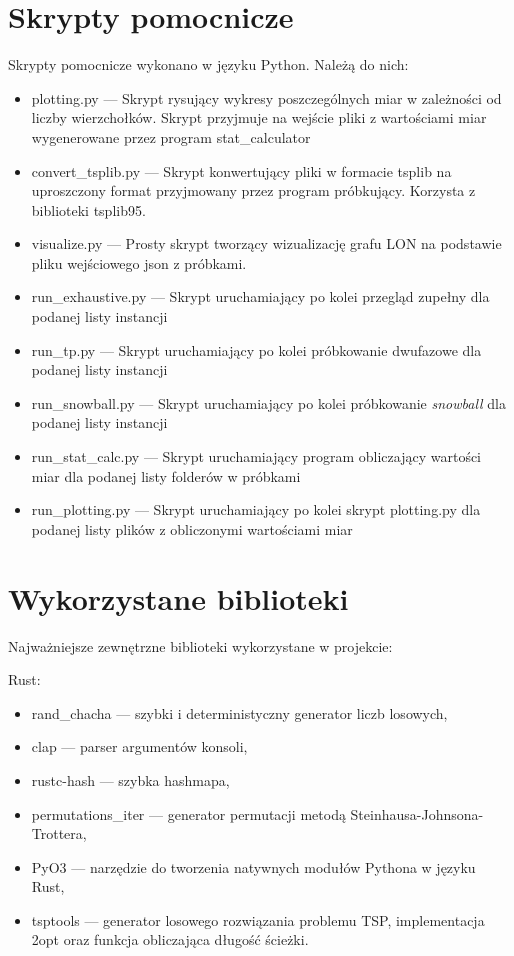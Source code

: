 \section{Skrypty pomocnicze}
Skrypty pomocnicze wykonano w języku Python.
Należą do nich:
\begin{itemize}
    \item plotting.py --- Skrypt rysujący wykresy poszczególnych miar w zależności od liczby wierzchołków. Skrypt przyjmuje na wejście pliki z wartościami miar wygenerowane przez program stat\_calculator
    \item convert\_tsplib.py --- Skrypt konwertujący pliki w formacie tsplib na uproszczony format przyjmowany przez program próbkujący. Korzysta z biblioteki tsplib95.
    \item visualize.py --- Prosty skrypt tworzący wizualizację grafu LON na podstawie pliku wejściowego json z próbkami.
    \item run\_exhaustive.py --- Skrypt uruchamiający po kolei przegląd zupełny dla podanej listy instancji
    \item run\_tp.py --- Skrypt uruchamiający po kolei próbkowanie dwufazowe dla podanej listy instancji
    \item run\_snowball.py --- Skrypt uruchamiający po kolei próbkowanie \textit{snowball} dla podanej listy instancji
    \item run\_stat\_calc.py --- Skrypt uruchamiający program obliczający wartości miar dla podanej listy folderów w próbkami
    \item run\_plotting.py --- Skrypt uruchamiający po kolei skrypt plotting.py dla podanej listy plików z obliczonymi wartościami miar
\end{itemize}

\section{Wykorzystane biblioteki}
Najważniejsze zewnętrzne biblioteki wykorzystane w projekcie:
\vspace{1em}

Rust:
\begin{itemize}
    \item rand\_chacha --- szybki i deterministyczny generator liczb losowych,
    \item clap --- parser argumentów konsoli,
    \item rustc-hash --- szybka hashmapa,
    \item permutations\_iter --- generator permutacji metodą Steinhausa-Johnsona-Trottera,
    \item PyO3 --- narzędzie do tworzenia natywnych modułów Pythona w języku Rust,
    \item tsptools --- generator losowego rozwiązania problemu TSP, implementacja 2opt oraz funkcja obliczająca długość ścieżki.
\end{itemize}

